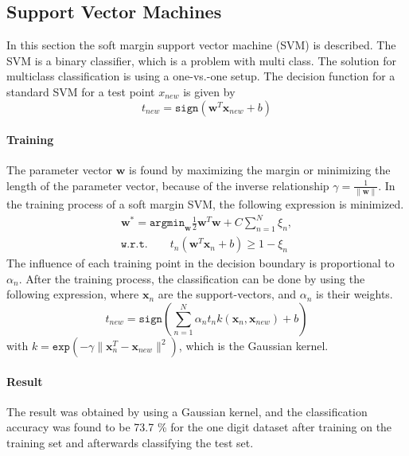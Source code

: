\subsection*{Support Vector Machines}
In this section the soft margin support vector machine (SVM) is described. 
The SVM is a binary classifier, which is a problem with multi class. 
The solution for multiclass classification is using a one-vs.-one setup.
The decision function for a standard SVM for a test point $ x_{new} $ is given by
\begin{equation}
t_{new} = \mathtt{sign}(\mathbf{w}^T \mathbf{x}_{new} +b)
\label{eq:SVM_lin}
\end{equation}

\paragraph*{Training}
The parameter vector $ \mathbf{w} $ is found by maximizing the margin or minimizing the length of the parameter vector, because of the inverse relationship $ \gamma = \frac{1}{\|\mathbf{w}\|} $.
In the training process of a soft margin SVM, the following expression is minimized. 
\begin{align}
\mathbf{w}^* = 
\mathtt{argmin}_\mathbf{w} \frac{1}{2} \mathbf{w}^T \mathbf{w}+C \sum_{n=1}^{N} \xi_n,\\ \mathtt{w.r.t.} \qquad t_n(\mathbf{w}^T \mathbf{x}_n + b) \geq 1-\xi_n
\end{align} 
The influence of each training point in the decision boundary is proportional to $ \alpha_n $.
After the training process, the classification can be done by using the following expression, where $ \mathbf{x}_n $  are the support-vectors, and $ \alpha_n $ is their weights.
\begin{equation}
t_{new} = 
\mathtt{sign}\left( \sum_{n=1}^{N} \alpha_n t_n k(\mathbf{x}_n,\mathbf{x}_{new}) +b  \right)
\end{equation}
with $ k = \mathtt{exp}(-\gamma \|\mathbf{x}^T_n - \mathbf{x}_{new} \|^2 ) $, which is the Gaussian kernel.

\paragraph*{Result}
The result was obtained by using a Gaussian kernel, and the classification accuracy was found to be 73.7 \% for the one digit dataset after training on the training set and afterwards classifying the test set.